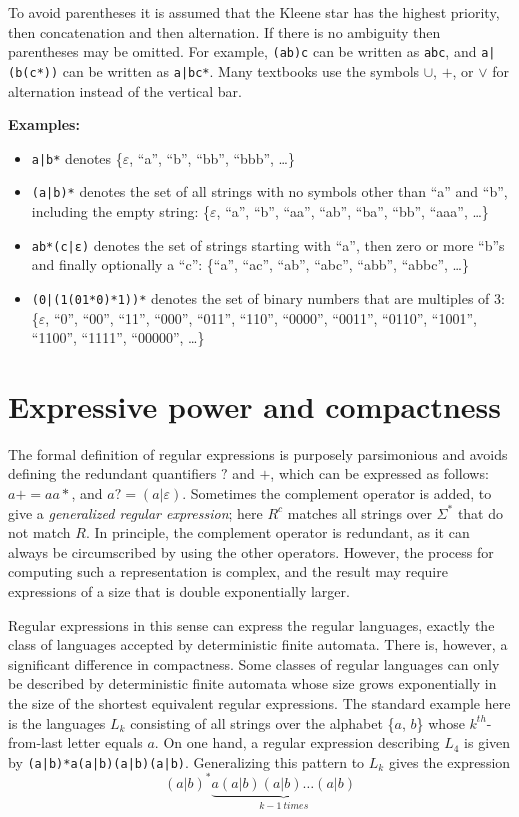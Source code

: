 To avoid parentheses it is assumed that the Kleene star has the
highest priority, then concatenation and then alternation. If there is
no ambiguity then parentheses may be omitted. For example,
\verb|(ab)c| can be written as \verb|abc|, and \verb/a|(b(c*))/ can be
written as \verb/a|bc*/. Many textbooks use the symbols $\cup$, $+$,
or $\vee$ for alternation instead of the vertical bar.

\textbf{Examples:}
\begin{itemize}
\item \verb/a|b*/ denotes \{$\varepsilon$, ``a'', ``b'', ``bb'',
  ``bbb'', \ldots\}
\item \verb/(a|b)*/ denotes the set of all strings with no symbols
  other than ``a'' and ``b'', including the empty string:
  \{$\varepsilon$, ``a'', ``b'', ``aa'', ``ab'', ``ba'', ``bb'',
  ``aaa'', \ldots\}
\item \verb/ab*(c|ε)/ denotes the set of strings starting with ``a'',
  then zero or more ``b''s and finally optionally a ``c'': \{``a'',
  ``ac'', ``ab'', ``abc'', ``abb'', ``abbc'', \ldots\}
\item \verb/(0|(1(01*0)*1))*/ denotes the set of binary numbers that
  are multiples of 3: \{$\varepsilon$, ``0'', ``00'', ``11'', ``000'',
  ``011'', ``110'', ``0000'', ``0011'', ``0110'', ``1001'', ``1100'',
  ``1111'', ``00000'', \ldots\}
\end{itemize}

\section{Expressive power and compactness}
The formal definition of regular expressions is purposely parsimonious
and avoids defining the redundant quantifiers $?$ and $+$, which can
be expressed as follows: $a+ = aa*$, and $a? = (a|\varepsilon)$.
Sometimes the complement operator is added, to give a
\textsl{generalized regular expression}; here $R^c$ matches all
strings over $\Sigma^*$ that do not match $R$. In principle, the
complement operator is redundant, as it can always be circumscribed by
using the other operators. However, the process for computing such a
representation is complex, and the result may require expressions of a
size that is double exponentially larger.

Regular expressions in this sense can express the regular languages,
exactly the class of languages accepted by deterministic finite
automata. There is, however, a significant difference in
compactness. Some classes of regular languages can only be described
by deterministic finite automata whose size grows exponentially in the
size of the shortest equivalent regular expressions. The standard
example here is the languages $L_k$ consisting of all strings over the
alphabet \{$a$, $b$\} whose $k^{th}$-from-last letter equals $a$. On
one hand, a regular expression describing $L_4$ is given by
\verb/(a|b)*a(a|b)(a|b)(a|b)/. Generalizing this pattern to $L_k$
gives the expression
\[(a|b)^*\underbrace{a(a|b)(a|b)\ldots(a|b)}_{k-1~times}\]

